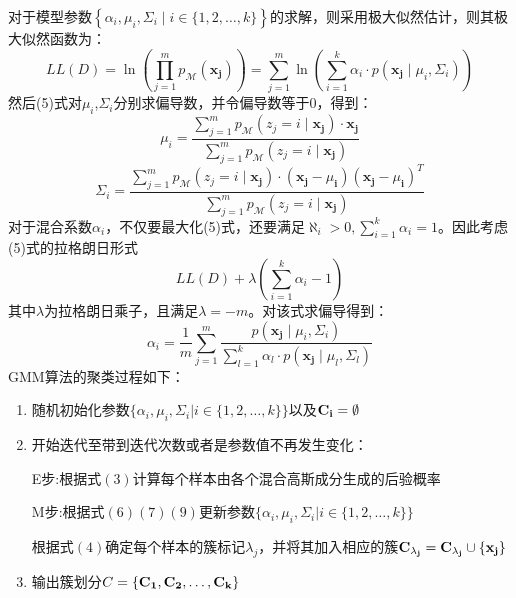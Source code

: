 \documentclass[lang=cn,a4paper,cite=authoryear]{elegantpaper}
\begin{document}
对于模型参数$\left\{\alpha_{i}, \mu_{i}, \Sigma_{i} \mid i \in\{1,2, \ldots, k\}\right\}$的求解，则采用极大似然估计，则其极大似然函数为：
\begin{equation}
	L L(D)=\ln \left(\prod_{j=1}^{m} p_{\mathcal{M}}\left(\mathbf{x}_{\mathbf{j}}\right)\right)=\sum_{j=1}^{m} \ln \left(\sum_{i=1}^{k} \alpha_{i} \cdot p\left(\mathbf{x}_{\mathbf{j}} \mid \mu_{i}, \Sigma_{i}\right)\right)
\end{equation}
然后(5)式对$\mu_{i}$,$\Sigma_{i}$分别求偏导数，并令偏导数等于0，得到：
\begin{equation}
	\mu_{i}=\frac{\sum_{j=1}^{m} p_{\mathcal{M}}\left(z_{j}=i \mid \mathbf{x}_{\mathbf{j}}\right) \cdot \mathbf{x}_{\mathbf{j}}}{\sum_{j=1}^{m} p_{\mathcal{M}}\left(z_{j}=i \mid \mathbf{x}_{\mathbf{j}}\right)}
\end{equation}
\begin{equation}
	\Sigma_{i}=\frac{\sum_{j=1}^{m} p_{\mathcal{M}}\left(z_{j}=i \mid \mathbf{x}_{\mathbf{j}}\right) \cdot\left(\mathbf{x}_{\mathbf{j}}-\mu_{\mathbf{i}}\right)\left(\mathbf{x}_{\mathbf{j}}-\mu_{\mathbf{i}}\right)^{T}}{\sum_{j=1}^{m} p_{\mathcal{M}}\left(z_{j}=i \mid \mathbf{x}_{\mathbf{j}}\right)}
\end{equation}
对于混合系数$\alpha_i$，不仅要最大化(5)式，还要满足$\aleph_i>0,\sum_{i=1}^{k} \alpha_{i}=1$。因此考虑(5)式的拉格朗日形式
\begin{equation}
	LL(D)+\lambda(\sum_{i=1}^{k} \alpha_{i}-1)
\end{equation}
其中$\lambda$为拉格朗日乘子，且满足$\lambda=-m$。对该式求偏导得到：
\begin{equation}
	\alpha_{i}=\frac{1}{m} \sum_{j=1}^{m} \frac{p\left(\mathbf{x}_{\mathbf{j}} \mid \mu_{i}, \Sigma_{i}\right)}{\sum_{l=1}^{k} \alpha_{l} \cdot p\left(\mathbf{x}_{\mathbf{j}} \mid \mu_{l}, \Sigma_{l}\right)}
\end{equation}
GMM算法的聚类过程如下：
\begin{enumerate}[(1)]
\item 随机初始化参数$\{\alpha_i, \mu_i, \Sigma_i|i \in \{1, 2, \dots, k\}\}$以及$\bold{C_i} = \emptyset$
\item 开始迭代至带到迭代次数或者是参数值不再发生变化：
      \par E步:根据式$(3)$计算每个样本由各个混合高斯成分生成的后验概率
      \par M步:根据式$(6)(7)(9)$更新参数$\{\alpha_i, \mu_i, \Sigma_i|i \in \{1, 2, \dots, k\}\}$
\par 根据式$(4)$确定每个样本的簇标记$\lambda_j$，并将其加入相应的簇$\bold{C_{\lambda_j}} = \bold{C_{\lambda_j} \cup \{\bold{x_j}\}}$
\item 输出簇划分$C = \{\bold{C_1, C_2, \dots, C_k}\}$
\end{enumerate}
\end{document}
